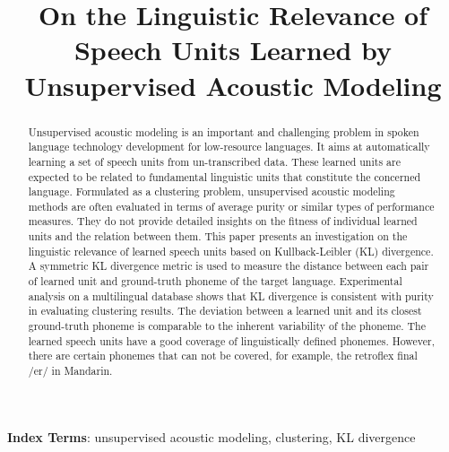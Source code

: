 \documentclass[a4paper]{article}
\title{On the Linguistic Relevance of Speech Units Learned by Unsupervised Acoustic Modeling}
\begin{document}
\maketitle
% 
\begin{abstract}
Unsupervised acoustic modeling is an important and challenging problem in spoken language technology development for low-resource languages. It aims at automatically learning a set of speech units from un-transcribed data. These learned units are expected to be related to fundamental linguistic units that constitute the concerned language. Formulated as a clustering problem, unsupervised acoustic modeling methods are often evaluated in terms of average purity or similar types of performance measures. They do not provide detailed insights on the fitness of individual learned units and the relation between them. This paper presents an investigation on the linguistic relevance of learned speech units based on Kullback-Leibler (KL) divergence. A symmetric KL divergence metric is used to measure the distance between each pair of learned unit and ground-truth phoneme of the target language. Experimental analysis on a multilingual database shows that KL divergence is consistent with purity in evaluating clustering results. The deviation between a learned unit and its closest ground-truth phoneme is comparable to the inherent variability of the phoneme. The learned speech units have a good coverage of linguistically defined phonemes. However, there are certain phonemes that can not be covered, for example, the retroflex final /er/ in Mandarin.
\end{abstract}
\noindent\textbf{Index Terms}: unsupervised acoustic modeling, clustering, KL divergence
\end{document}

